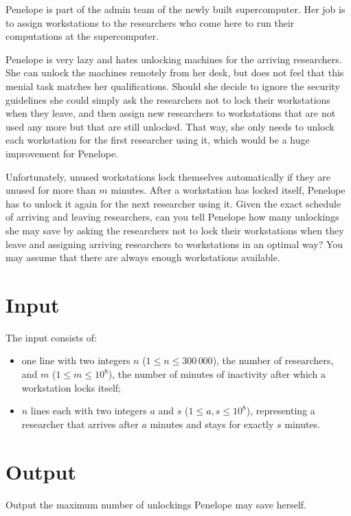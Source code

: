 
%
\noindent
Penelope is part of the admin team of the newly built supercomputer. Her job is
to assign workstations to the researchers who come here to run their
computations at the supercomputer.

Penelope is very lazy and hates unlocking machines for the arriving
researchers. She can unlock the machines remotely from her desk, but does not
feel that this menial task matches her qualifications. Should she decide to
ignore the security guidelines she could simply ask the researchers not to lock
their workstations when they leave, and then assign new researchers to
workstations that are not used any more but that are still unlocked. That way,
she only needs to unlock each workstation for the first researcher using it,
which would be a huge improvement for Penelope.

Unfortunately, unused workstations lock themselves automatically if they are
unused for more than $m$ minutes. After a workstation has locked itself,
Penelope has to unlock it again for the next researcher using it. Given the
exact schedule of arriving and leaving researchers, can you tell Penelope how
many unlockings she may save by asking the researchers not to lock their
workstations when they leave and assigning arriving researchers to workstations
in an optimal way? You may assume that there are always enough workstations
available.

\section*{Input}

The input consists of:
\begin{itemize}
  \item one line with two integers $n$ ($1 \leq n \leq 300\,000$), the number
        of researchers, and $m$ ($1 \leq m \leq 10^8$), the number of minutes
        of inactivity after which a workstation locks itself;
  \item $n$ lines each with two integers $a$ and $s$ ($1 \leq a, s \leq 10^8$),
        representing a researcher that arrives after $a$ minutes and stays for
        exactly $s$ minutes.
\end{itemize}

\section*{Output}

Output the maximum number of unlockings Penelope may save herself.
